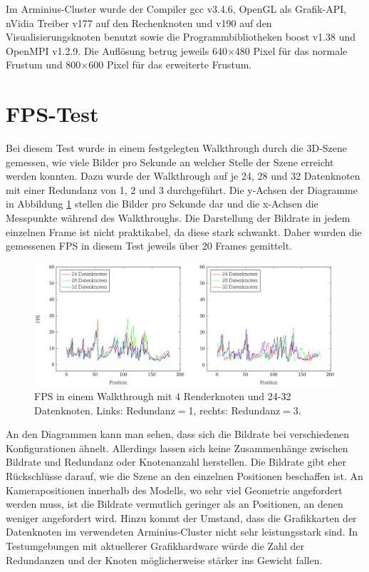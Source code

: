 Im Arminius-Cluster wurde der Compiler gcc v3.4.6, OpenGL als Grafik-API, nVidia Treiber v177 auf den Rechenknoten und v190 auf den Visualisierungsknoten benutzt sowie die Programmbibliotheken boost v1.38 und OpenMPI v1.2.9. Die Auflösung betrug jeweils 640$\times$480 Pixel für das normale Frustum und 800$\times$600 Pixel für das erweiterte Frustum.

\section{FPS-Test}
\label{sec:eval:fps}
Bei diesem Test wurde in einem festgelegten Walkthrough durch die 3D-Szene gemessen, wie viele Bilder pro Sekunde an welcher Stelle der Szene erreicht werden konnten. Dazu wurde der Walkthrough auf je 24, 28 und 32 Datenknoten mit einer Redundanz von 1, 2 und 3 durchgeführt. Die y-Achsen der Diagramme in Abbildung \ref{fig:eval:fps} stellen die Bilder pro Sekunde dar und die x-Achsen die Messpunkte während des Walkthroughs. Die Darstellung der Bildrate in jedem einzelnen Frame ist nicht praktikabel, da diese stark schwankt. Daher wurden die gemessenen FPS in diesem Test jeweils über 20 Frames gemittelt.
\begin{figure}
\centering
\includegraphics[width=\hsize]{images/diag_fps.pdf}
  \caption{\label{fig:eval:fps}FPS in einem Walkthrough mit 4 Renderknoten und 24-32 Datenknoten. Links: Redundanz$=$1, rechts: Redundanz$=$3.}
\end{figure}

An den Diagrammen kann man sehen, dass sich die Bildrate bei verschiedenen Konfigurationen ähnelt. Allerdings lassen sich keine Zusammenhänge zwischen Bildrate und Redundanz oder Knotenanzahl herstellen. Die Bildrate gibt eher Rückschlüsse darauf, wie die Szene an den einzelnen Positionen beschaffen ist. An Kamerapositionen innerhalb des Modells, wo sehr viel Geometrie angefordert werden muss, ist die Bildrate vermutlich geringer als an Positionen, an denen weniger angefordert wird. Hinzu kommt der Umstand, dass die Grafikkarten der Datenknoten im verwendeten Arminius-Cluster nicht sehr leistungsstark sind. In Testumgebungen mit aktuellerer Grafikhardware würde die Zahl der Redundanzen und der Knoten möglicherweise stärker ins Gewicht fallen. 

